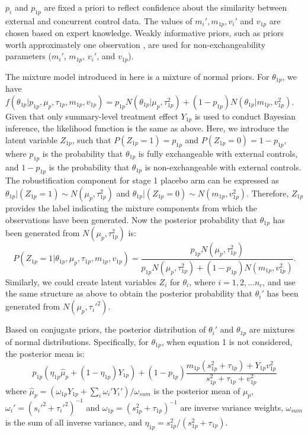 $p_i$ and $p_{1p}$ are fixed a priori to reflect confidence about the similarity between external and concurrent control data. The values of $m_i', m_{1p}, v_i'$ and $v_{1p}$ are chosen based on expert knowledge. Weakly informative priors, such as priors worth approximately one observation \citep{kass1995reference}, are used for non-exchangeability parameters ($m_{i}'$, $m_{1p}$, $v_{i}'$, and $v_{1p}$). 

The mixture model introduced in here is a mixture of normal priors. For $\theta_{1p}$, we have $f(\theta_{1p}|p_{1p}, \mu_{p},\tau_{1p}, m_{1p}, v_{1p}) = p_{1p}N(\theta_{1p}|\mu_p,\tau_{1p}^2)+(1-p_{1p})N(\theta_{1p}|m_{1p},v_{1p}^2)$. Given that only summary-level treatment effect $Y_{1p}$ is used to conduct Bayesian inference, the likelihood function is the same as above. Here, we introduce the latent variable $Z_{1p}$, such that $P(Z_{1p} = 1) = p_{1p}$ and $P(Z_{1p} = 0) = 1-p_{1p}$, where $p_{1p}$ is the probability that $\theta_{1p}$ is fully exchangeable with external controls, and $1 - p_{1p}$ is the probability that $\theta_{1p}$ is non-exchangeable with external controls. The robustification component for stage 1 placebo arm can be expressed as $\theta_{1p}|(Z_{1p} = 1) \sim N(\mu_{p},\tau_{1p}^2)$ and $\theta_{1p}|(Z_{1p} = 0) \sim N(m_{1p}, v_{1p}^2)$.
Therefore, $Z_{1p}$ provides the label indicating the mixture components from which the observations have been generated. Now the posterior probability that $\theta_{1p}$ has been generated from $N(\mu_p, \tau_{1p}^2)$ is:
\begin{equation*}
    P(Z_{1p} = 1|\theta_{1p}, \mu_{p},\tau_{1p}, m_{1p}, v_{1p})=\frac{p_{1p}N(\mu_p, \tau_{1p}^2)}{p_{1p}N(\mu_p, \tau_{1p}^2)+(1-p_{1p})N(m_{1p}, v_{1p}^2)}.
\end{equation*}
Similarly, we could create latent variables $Z_i$ for $\theta_i$, where $i = 1, 2, ... n_c$, and use the same structure as above to obtain the posterior probability that $\theta_i'$ has been generated from $N(\mu_p, \tau_i'^2)$. 

Based on conjugate priors, the posterior distribution of $\theta_i'$ and $\theta_{1p}$ are mixtures of normal distributions. Specifically, for $\theta_{1p}$, when equation 1 is not considered, the posterior mean is:
\begin{equation*}
    p_{1p}(\eta_{1p}\hat{\mu}_p+(1-\eta_{1p})Y_{1p})+(1-p_{1p})\frac{m_{1p}(s_{1p}^2+\tau_{1p})+Y_{1p}v_{1p}^2}{s_{1p}^2+\tau_{1p}+v_{1p}^2}
\end{equation*}
where $\hat{\mu}_p = (\omega_{1p}Y_{1p} + \sum_{i}{\omega_{i}'Y_{i}'})/\omega_{sum}$ is the posterior mean of $\mu_p$, $\omega_i' = (s_i'^2+\tau_i'^2)^{-1}$ and $\omega_{1p} = (s_{1p}^2+\tau_{1p})^{-1}$ are inverse variance weights, $\omega_{sum}$ is the sum of all inverse variance, and $\eta_{1p}=s_{1p}^2/(s_{1p}^2+\tau_{1p})$. 

